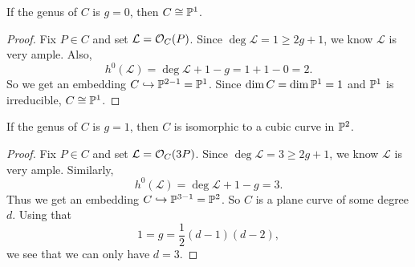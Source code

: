 \begin{corollary}
  If the genus of $C$ is $g = 0$, then
  $C \cong \mathbb{P}^1$.
\end{corollary}

\begin{proof}
  Fix $P \in C$ and set $\mathcal{L} = \mathcal{O}_C(P)$.
  Since $\deg \mathcal{L} = 1 \ge 2g + 1$, we know
  $\mathcal{L}$ is very ample. Also,
  \[
    h^0(\mathcal{L})
    = \deg \mathcal{L} + 1 - g
    = 1 + 1 - 0 = 2.
  \]
  So we get an embedding
  $C \hookrightarrow \mathbb{P}^{2 - 1} = \mathbb{P}^1$.
  Since $\dim C = \dim \mathbb{P}^1 = 1$ and
  $\mathbb{P}^1$ is irreducible,
  $C \cong \mathbb{P}^1$.
\end{proof}

\begin{corollary}
  If the genus of $C$ is $g = 1$, then
  $C$ is isomorphic to a cubic curve in $\mathbb{P}^2$.
\end{corollary}

\begin{proof}
  Fix $P \in C$ and set $\mathcal{L} = \mathcal{O}_C(3P)$.
  Since $\deg \mathcal{L} = 3 \ge 2g + 1$,
  we know
  $\mathcal{L}$ is very ample.
  Similarly,
  \[
    h^0(\mathcal{L})
    = \deg \mathcal{L} + 1 - g = 3.
  \]
  Thus we get an embedding
  $C \hookrightarrow \mathbb{P}^{3 - 1} = \mathbb{P}^2$.
  So $C$ is a plane curve of some
  degree $d$. Using that
  \[
    1 = g = \frac{1}{2}(d - 1)(d - 2),
  \]
  we see that we can only have $d = 3$.
\end{proof}
